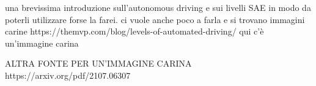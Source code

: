 una brevissima introduzione sull'autonomous driving e sui livelli SAE in modo da poterli utilizzare forse la farei. ci vuole anche poco a farla e si trovano immagini carine 
https://themvp.com/blog/levels-of-automated-driving/
qui c'è un'immagine carina 



ALTRA FONTE PER UN'IMMAGINE CARINA 
https://arxiv.org/pdf/2107.06307
